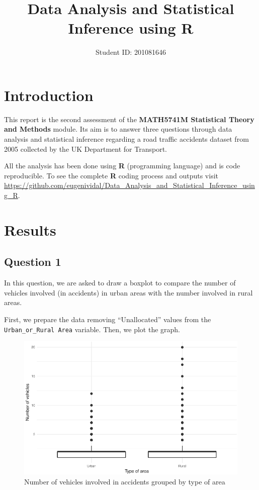 \documentclass[]{article}
\title{Data Analysis and Statistical Inference using R}
\author{Student ID: 201081646}
\date{}
\begin{document}
\maketitle

\section{Introduction}\label{introduction}

This report is the second assessment of the \textbf{MATH5741M
Statistical Theory and Methods} module. Its aim is to answer three
questions through data analysis and statistical inference regarding a
road traffic accidents dataset from 2005 collected by the UK Department
for Transport.

All the analysis has been done using \textbf{R} (programming language)
and is code reproducible. To see the complete \textbf{R} coding process
and outputs visit
\url{https://github.com/eugenividal/Data_Analysis_and_Statistical_Inference_using_R}.

\section{Results}\label{results}

\subsection{Question 1}\label{question-1}

In this question, we are asked to draw a boxplot to compare the number
of vehicles involved (in accidents) in urban areas with the number
involved in rural areas.

First, we prepare the data removing ``Unallocated'' values from the
\texttt{Urban\_or\_Rural\ Area} variable. Then, we plot the graph.

\begin{figure}[H]

{\centering \includegraphics{READMEv5_files/figure-latex/fig-1} 

}

\caption{Number of vehicles involved in accidents grouped by type of area}\label{fig:fig}
\end{figure}
\end{document}
